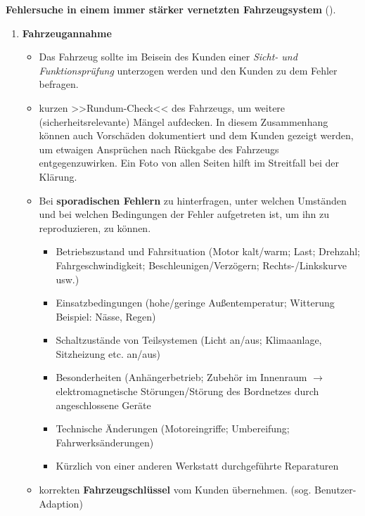\textbf{Fehlersuche in einem immer stärker vernetzten Fahrzeugsystem}
(\textcite{respondeck:2019:servicetechniker}).

\begin{enumerate}
\item
  \textbf{Fahrzeugannahme}

  \begin{itemize}
  \item
    Das Fahrzeug sollte im Beisein des Kunden einer \emph{Sicht- und
    Funktionsprüfung} unterzogen werden und den Kunden zu dem Fehler
    befragen.
  \item
    kurzen >>Rundum-Check<< des Fahrzeugs, um weitere
    (sicherheitsrelevante) Mängel aufdecken. In diesem Zusammenhang
    können auch Vorschäden dokumentiert und dem Kunden gezeigt werden,
    um etwaigen Ansprüchen nach Rückgabe des Fahrzeugs entgegenzuwirken.
    Ein Foto von allen Seiten hilft im Streitfall bei der Klärung.
  \item
    Bei \textbf{sporadischen Fehlern} zu hinterfragen, unter welchen
    Umständen und bei welchen Bedingungen der Fehler aufgetreten ist, um
    ihn zu reproduzieren, zu können.

    \begin{itemize}
    \item
      Betriebszustand und Fahrsituation (Motor kalt/warm; Last;
      Drehzahl; Fahrgeschwindigkeit; Beschleunigen/Verzögern;
      Rechts-/Linkskurve usw.)
    \item
      Einsatzbedingungen (hohe/geringe Außentemperatur; Witterung
      Beispiel: Nässe, Regen)
    \item
      Schaltzustände von Teilsystemen (Licht an/aus; Klimaanlage,
      Sitzheizung etc. an/aus)
    \item
      Besonderheiten (Anhängerbetrieb; Zubehör im Innenraum $\to$
      elektromagnetische Störungen/Störung des Bordnetzes durch
      angeschlossene Geräte
    \item
      Technische Änderungen (Motoreingriffe; Umbereifung;
      Fahrwerksänderungen)
    \item
      Kürzlich von einer anderen Werkstatt durchgeführte Reparaturen
    \end{itemize}
  \item
    korrekten \textbf{Fahrzeugschlüssel} vom Kunden übernehmen. (sog.
    Benutzer-Adaption)


\end{itemize}
\end{enumerate}
